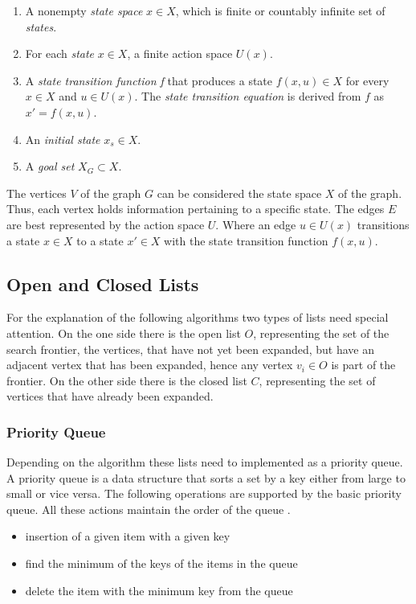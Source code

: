 \begin{enumerate}
    \item A nonempty \textit{state space} $x \in X$, which is finite or countably infinite set of \textit{states}.
    \item For each \textit{state} $x \in X$, a finite action space $U(x)$.
    \item A \textit{state transition function f} that produces a state $f(x,u) \in X$ for every $x \in X$ and $u \in U(x)$. The \textit{state transition equation} is derived from $f$ as $x' = f(x,u)$.
    \item An \textit{initial state} $x_s \in X$.
    \item A \textit{goal set} $X_G \subset X$.
\end{enumerate}

The vertices $V$ of the graph $G$ can be considered the state space $X$ of the graph. Thus, each vertex holds information pertaining to a specific state. The edges $E$ are best represented by the action space $U$. Where an edge $u \in U(x)$ transitions a state $x \in X$ to a state $x' \in X$ with the state transition function $f(x,u)$.

\subsection{Open and Closed Lists}
For the explanation of the following algorithms two types of lists need special attention. On the one side there is the open list $O$, representing the set of the search frontier, the vertices, that have not yet been expanded, but have an adjacent vertex that has been expanded, hence any vertex $v_i \in O$ is part of the frontier. On the other side there is the closed list $C$, representing the set of vertices that have already been expanded.

\subsubsection{Priority Queue}

Depending on the algorithm these lists need to implemented as a priority queue. A priority queue is a data structure that sorts a set by a key either from large to small or vice versa. The following operations are supported by the basic priority queue. All these actions maintain the order of the queue \cite{Skiena.2008}.

\begin{itemize}
    \item insertion of a given item with a given key
    \item find the minimum of the keys of the items in the queue
    \item delete the item with the minimum key from the queue
\end{itemize}


